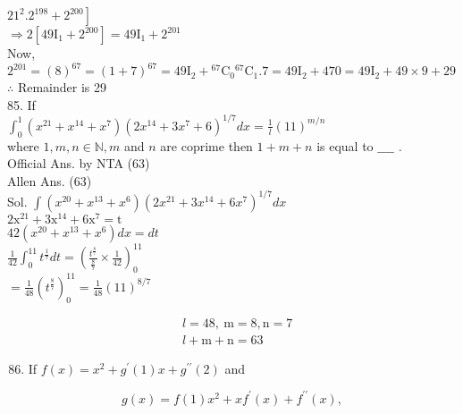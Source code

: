 \documentclass[10pt]{article}
\begin{document}
\(\left.21^{2} .2^{198}+2^{200}\right]\)\\
\(\Rightarrow 2\left[49 \mathrm{I}_{1}+2^{200}\right]=49 \mathrm{I}_{1}+2^{201}\)\\
Now, \(2^{201}=(8)^{67}=(1+7)^{67}=49 \mathrm{I}_{2}+{ }^{67} \mathrm{C}_{0}{ }^{67} \mathrm{C}_{1} .7= 49 \mathrm{I}_{2}+470=49 \mathrm{I}_{2}+49 \times 9+29\)\\
\(\therefore\) Remainder is 29\\
85. If\\
\(\int_{0}^{1}\left(x^{21}+x^{14}+x^{7}\right)\left(2 x^{14}+3 x^{7}+6\right)^{1 / 7} d x=\frac{1}{l}(11)^{m / n}\)\\
where \(1, m, n \in \mathbb{N}, m\) and \(n\) are coprime then \(1+m+n\) is equal to \(\_\_\_\_\) .\\
Official Ans. by NTA (63)\\
Allen Ans. (63)\\
Sol. \(\int\left(x^{20}+x^{13}+x^{6}\right)\left(2 x^{21}+3 x^{14}+6 x^{7}\right)^{1 / 7} d x\)\\
\(2 \mathrm{x}^{21}+3 \mathrm{x}^{14}+6 \mathrm{x}^{7}=\mathrm{t}\)\\
\(42\left(x^{20}+x^{13}+x^{6}\right) d x=d t\)\\
\(\frac{1}{42} \int_{0}^{11} t^{\frac{1}{7}} d t=\left(\frac{t^{\frac{8}{7}}}{\frac{8}{7}} \times \frac{1}{42}\right)_{0}^{11}\)\\
\(=\frac{1}{48}\left(t^{\frac{8}{7}}\right)_{0}^{11}=\frac{1}{48}(11)^{8 / 7}\)

\[
\begin{aligned}
& l=48, \mathrm{~m}=8, \mathrm{n}=7 \\
& l+\mathrm{m}+\mathrm{n}=63
\end{aligned}
\]

\begin{enumerate}
  \setcounter{enumi}{85}
  \item If \(f(x)=x^{2}+g^{\prime}(1) x+g^{\prime \prime}(2)\) and
\end{enumerate}

\[
g(x)=f(1) x^{2}+x f^{\prime}(x)+f^{\prime \prime}(x),
\]
\end{document}
